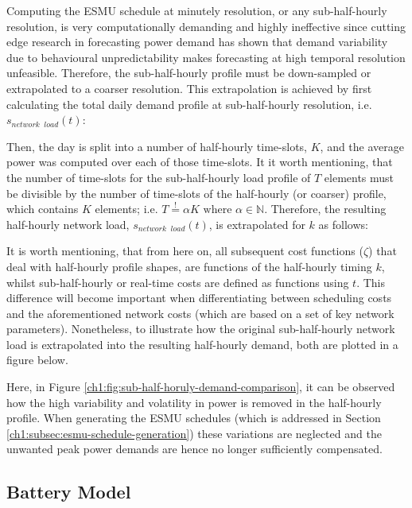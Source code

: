 Computing the ESMU schedule at minutely resolution, or any sub-half-hourly resolution, is very computationally demanding and highly ineffective since cutting edge research in forecasting power demand has shown that demand variability due to behavioural unpredictability makes forecasting at high temporal resolution unfeasible.
Therefore, the sub-half-hourly profile must be down-sampled or extrapolated to a coarser resolution.
This extrapolation is achieved by first calculating the total daily demand profile at sub-half-hourly resolution, i.e. $s_{network\;\;load}(t)$:



Then, the day is split into a number of half-hourly time-slots, $K$, and the average power was computed over each of those time-slots.
It it worth mentioning, that the number of time-slots for the sub-half-hourly load profile of $T$ elements must be divisible by the number of time-slots of the half-hourly (or coarser) profile, which contains $K$ elements; i.e. $T \overset{!}{=} \alpha K \text{ where } \alpha \in \mathbb{N}$.
Therefore, the resulting half-hourly network load, $s_{network\;\;load}(t)$, is extrapolated for $k$ as follows:



It is worth mentioning, that from here on, all subsequent cost functions ($\zeta$) that deal with half-hourly profile shapes, are functions of the half-hourly timing $k$, whilst sub-half-hourly or real-time costs are defined as functions using $t$.
This difference will become important when differentiating between scheduling costs and the aforementioned network costs (which are based on a set of key network parameters).
Nonetheless, to illustrate how the original sub-half-hourly network load is extrapolated into the resulting half-hourly demand, both are plotted in a figure below.



Here, in Figure \ref{ch1:fig:sub-half-horuly-demand-comparison}, it can be observed how the high variability and volatility in power is removed in the half-hourly profile.
When generating the ESMU schedules (which is addressed in Section \ref{ch1:subsec:esmu-schedule-generation}) these variations are neglected and the unwanted peak power demands are hence no longer sufficiently compensated.

\subsection{Battery Model}

